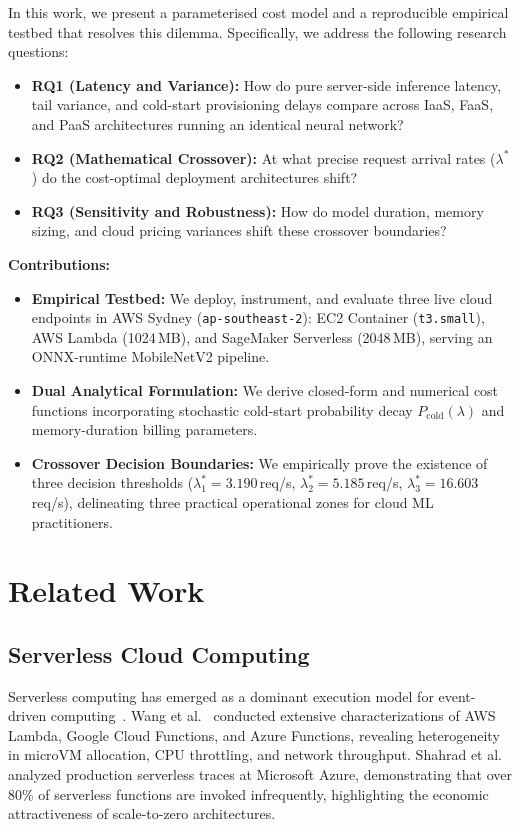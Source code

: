 \documentclass[conference]{IEEEtran}
\begin{document}
In this work, we present a parameterised cost model and a reproducible empirical testbed that resolves this dilemma. Specifically, we address the following research questions:
\begin{itemize}
    \item \textbf{RQ1 (Latency and Variance):} How do pure server-side inference latency, tail variance, and cold-start provisioning delays compare across IaaS, FaaS, and PaaS architectures running an identical neural network?
    \item \textbf{RQ2 (Mathematical Crossover):} At what precise request arrival rates ($\lambda^*$) do the cost-optimal deployment architectures shift?
    \item \textbf{RQ3 (Sensitivity and Robustness):} How do model duration, memory sizing, and cloud pricing variances shift these crossover boundaries?
\end{itemize}

\textbf{Contributions:}
\begin{itemize}
    \item \textbf{Empirical Testbed:} We deploy, instrument, and evaluate three live cloud endpoints in AWS Sydney (\texttt{ap-southeast-2}): EC2 Container (\texttt{t3.small}), AWS Lambda (1024\,MB), and SageMaker Serverless (2048\,MB), serving an ONNX-runtime MobileNetV2 pipeline.
    \item \textbf{Dual Analytical Formulation:} We derive closed-form and numerical cost functions incorporating stochastic cold-start probability decay $P_{\text{cold}}(\lambda)$ and memory-duration billing parameters.
    \item \textbf{Crossover Decision Boundaries:} We empirically prove the existence of three decision thresholds ($\lambda_1^* = 3.190$\,req/s, $\lambda_2^* = 5.185$\,req/s, $\lambda_3^* = 16.603$\,req/s), delineating three practical operational zones for cloud ML practitioners.
\end{itemize}

\section{Related Work}
\subsection{Serverless Cloud Computing}
Serverless computing has emerged as a dominant execution model for event-driven computing~\cite{jonas2019cloud}. Wang et al.~\cite{wang2018peeking} conducted extensive characterizations of AWS Lambda, Google Cloud Functions, and Azure Functions, revealing heterogeneity in microVM allocation, CPU throttling, and network throughput. Shahrad et al.~\cite{shahrad2020serverless} analyzed production serverless traces at Microsoft Azure, demonstrating that over 80\% of serverless functions are invoked infrequently, highlighting the economic attractiveness of scale-to-zero architectures.
\end{document}
